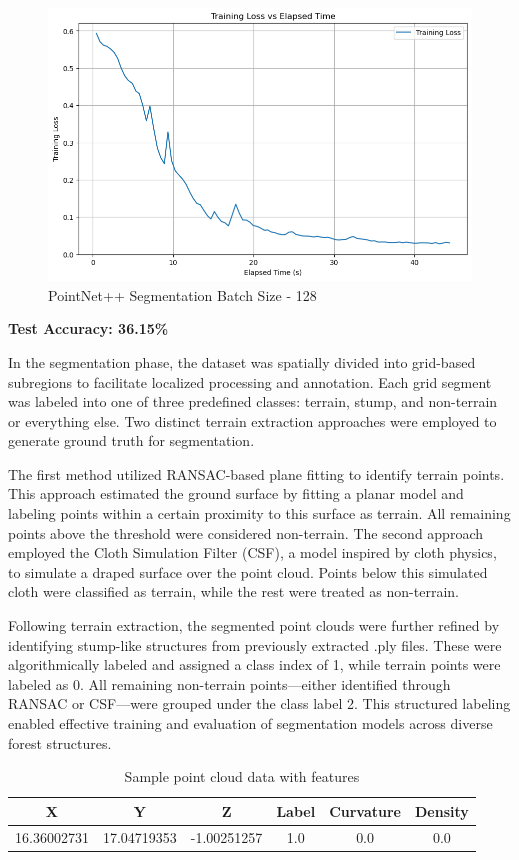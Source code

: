 \documentclass[../report.tex]{subfiles}
\begin{document}
\begin{figure}
    \centering
    \includegraphics[width=0.7\linewidth]{rnd-project-report-main/figures/PointNetSeg_bs128.png}
    \caption{PointNet++ Segmentation Batch Size - 128}
    \label{fig:pointnetseg_bs128}
\end{figure}
\noindent\textbf{Test Accuracy: 36.15\%}

In the segmentation phase, the dataset was spatially divided into grid-based subregions to facilitate localized processing and annotation. Each grid segment was labeled into one of three predefined classes: terrain, stump, and non-terrain or everything else. Two distinct terrain extraction approaches were employed to generate ground truth for segmentation.

The first method utilized RANSAC-based plane fitting to identify terrain points. This approach estimated the ground surface by fitting a planar model and labeling points within a certain proximity to this surface as terrain. All remaining points above the threshold were considered non-terrain. The second approach employed the Cloth Simulation Filter (CSF), a model inspired by cloth physics, to simulate a draped surface over the point cloud. Points below this simulated cloth were classified as terrain, while the rest were treated as non-terrain.

Following terrain extraction, the segmented point clouds were further refined by identifying stump-like structures from previously extracted .ply files. These were algorithmically labeled and assigned a class index of 1, while terrain points were labeled as 0. All remaining non-terrain points—either identified through RANSAC or CSF—were grouped under the class label 2. This structured labeling enabled effective training and evaluation of segmentation models across diverse forest structures.\cite{Pytorch_Pointnet_Pointnet2}

\begin{table}[h!]
\centering

\begin{tabular}{cccccc}
\toprule
X & Y & Z & Label & Curvature & Density \\
\midrule
16.36002731 & 17.04719353 & -1.00251257 & 1.0 & 0.0 & 0.0 \\
\bottomrule
\end{tabular}
\caption{Sample point cloud data with features}
\label{tab:datasample}
\end{table}
\end{document}
